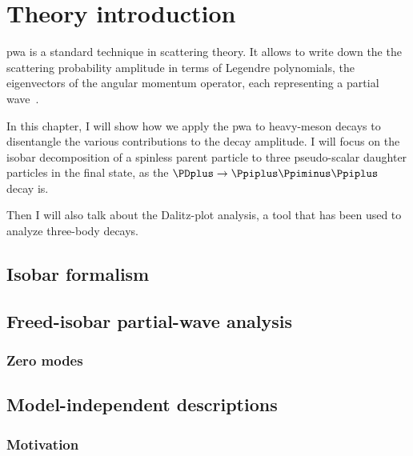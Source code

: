 \chapter{Theory introduction}
\label{chap:theory}

    \Ac{pwa} is a standard technique in scattering theory.
    It allows to write down the the scattering probability amplitude in terms of Legendre polynomials, the eigenvectors of the angular momentum operator, each representing a partial wave~\cite[\S~11.2]{griffiths_intro_qm}.


    In this chapter, I will show how we apply the \ac{pwa} to heavy-meson decays to disentangle the various contributions to the decay amplitude.
    I will focus on the isobar decomposition of a spinless parent particle to three pseudo-scalar daughter particles in the final state, as the $\PDplus\to\Ppiplus\Ppiminus\Ppiplus$ decay is.


    Then I will also talk about the Dalitz-plot analysis, a tool that has been used to analyze three-body decays.

    
    


    \section{Isobar formalism}
    

    \section{Freed-isobar partial-wave analysis}
    

        \subsection{Zero modes}
        

    \section{Model-independent descriptions}

    \subsection{Motivation}

